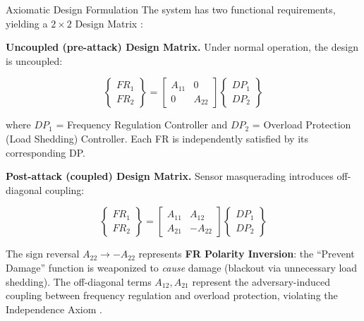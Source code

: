\documentclass[
  ignorenonframetext,
]{beamer}
\begin{document}
\begin{frame}[allowframebreaks]{Axiomatic Design Formulation}
\protect{}\label{axiomatic-design-formulation}
The system has two functional requirements, yielding a \(2 \times 2\)
Design Matrix \cite{suh2001axiomatic}:

\textbf{Uncoupled (pre-attack) Design Matrix.} Under normal operation,
the design is uncoupled:

\begin{equation}
\begin{Bmatrix} FR_1 \\ FR_2 \end{Bmatrix} = \begin{bmatrix} A_{11} & 0 \\ 0 & A_{22} \end{bmatrix} \begin{Bmatrix} DP_1 \\ DP_2 \end{Bmatrix}
\label{eq:infrastructure_baseline}
\end{equation}

where \(DP_1\) = Frequency Regulation Controller and \(DP_2\) = Overload
Protection (Load Shedding) Controller. Each FR is independently
satisfied by its corresponding DP.

\textbf{Post-attack (coupled) Design Matrix.} Sensor masquerading
introduces off-diagonal coupling:

\begin{equation}
\begin{Bmatrix} FR_1 \\ FR_2 \end{Bmatrix} = \begin{bmatrix} A_{11} & A_{12} \\ A_{21} & -A_{22} \end{bmatrix} \begin{Bmatrix} DP_1 \\ DP_2 \end{Bmatrix}
\label{eq:infrastructure_coupled}
\end{equation}

The sign reversal \(A_{22} \to -A_{22}\) represents \textbf{FR Polarity
Inversion}: the ``Prevent Damage'' function is weaponized to
\emph{cause} damage (blackout via unnecessary load shedding). The
off-diagonal terms \(A_{12}, A_{21}\) represent the adversary-induced
coupling between frequency regulation and overload protection, violating
the Independence Axiom \cite{suh2001axiomatic, friedman2026cogsec2}.
\end{frame}
\end{document}
